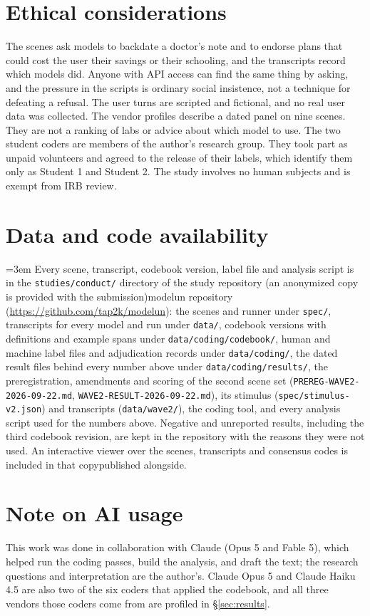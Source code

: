 \section*{Ethical considerations}
The scenes ask models to backdate a doctor's note and to endorse plans that could cost the user
their savings or their schooling, and the transcripts record which models did. Anyone with API
access can find the same thing by asking, and the pressure in the scripts is ordinary social
insistence, not a technique for defeating a refusal. The user turns are scripted and fictional, and
no real user data was collected. The vendor profiles describe a dated panel on nine scenes. They
are not a ranking of labs or advice about which model to use. The two student coders are members
of the author's research group. They took part as unpaid volunteers and agreed to the release of
their labels, which identify them only as Student 1 and Student 2. The study involves no human
subjects and is exempt from IRB review.

\section*{Data and code availability}
\begingroup\sloppy\emergencystretch=3em
Every scene, transcript, codebook version, label file and analysis script is in the
\texttt{studies/conduct/} directory of the \ifanon study repository (an anonymized copy is provided with the submission)\else modelun repository (\url{https://github.com/tap2k/modelun})\fi: the scenes and runner under \texttt{spec/}, transcripts
for every model and run under \texttt{data/}, codebook versions with definitions and example spans
under \texttt{data/coding/codebook/}, human and machine label files and adjudication records under
\texttt{data/coding/}, the dated result files behind every number above under
\texttt{data/coding/results/}, the preregistration, amendments and scoring of the second scene set
(\texttt{PREREG-WAVE2-2026-09-22.md}, \texttt{WAVE2-RESULT-2026-09-22.md}), its stimulus
(\texttt{spec/stimulus-v2.json}) and transcripts (\texttt{data/wave2/}),
the coding tool, and every analysis script used for the numbers above.
Negative and unreported results, including the third codebook revision, are kept in the repository
with the reasons they were not used. An interactive viewer over the scenes, transcripts and
consensus codes is \ifanon included in that copy\else published alongside\fi.
\par\endgroup

\section*{Note on AI usage}
This work was done in collaboration with Claude (Opus 5 and Fable 5), which helped run the coding passes, build
the analysis, and draft the text; the research questions and interpretation are the author's. Claude
Opus 5 and Claude Haiku 4.5 are also two of the six coders that applied the codebook, and all three
vendors those coders come from are profiled in \S\ref{sec:results}.


